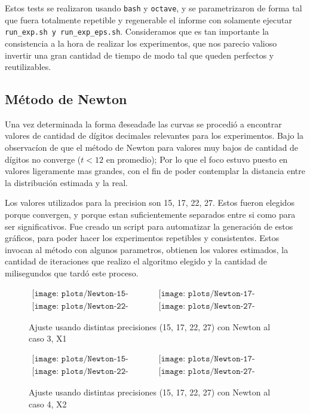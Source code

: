 Estos tests se realizaron usando \texttt{bash} y \texttt{octave}, y se parametrizaron
de forma tal que fuera totalmente repetible y regenerable el informe con solamente
ejecutar \texttt{run\_exp.sh y run\_exp\_eps.sh}. Consideramos que es tan importante
la consistencia a la hora de realizar los experimentos, que nos parecio valioso
invertir una gran cantidad de tiempo de modo tal que queden perfectos y reutilizables.

\subsection{M\'etodo de Newton}

Una vez determinada la forma \"deseada\" de las curvas se procedi\'o a encontrar
valores de cantidad de d\'igitos decimales relevantes para los experimentos. 
Bajo la observac\'ion de que el m\'etodo de Newton para valores muy bajos de 
cantidad de d\'igitos no converge ($t < 12$ en promedio); Por lo que el foco
estuvo puesto en valores ligeramente mas grandes, con el fin de poder contemplar
la distancia entre la distribuci\'on estimada y la real.

Los valores utilizados para la precision son 15, 17, 22, 27. 
Estos fueron elegidos porque convergen, y porque estan suficientemente separados
entre si como para ser significativos. Fue creado un script para automatizar la 
generaci\'on de estos gr\'aficos, para poder hacer los experimentos repetibles 
y consistentes. Estos invocan al m\'etodo con algunos parametros, 
obtienen los valores estimados, la cantidad de iteraciones que realizo el 
algoritmo elegido y la cantidad de milisegundos que tard\'o este proceso.

\begin{figure} [H]
$\begin{array}{cc}
\texttt{[image: plots/Newton-15-caso3.png]} &
\texttt{[image: plots/Newton-17-caso3.png]} \\
\texttt{[image: plots/Newton-22-caso3.png]} &
\texttt{[image: plots/Newton-27-caso3.png]}
\end{array}$
\caption{Ajuste usando distintas precisiones (15, 17, 22, 27) con Newton al caso 3, X1}
\label{fig:FitCaso3Newton}
\end{figure}

\begin{figure} [H]
$\begin{array}{cc}
\texttt{[image: plots/Newton-15-caso4.png]} &
\texttt{[image: plots/Newton-17-caso4.png]} \\
\texttt{[image: plots/Newton-22-caso4.png]} &
\texttt{[image: plots/Newton-27-caso4.png]}
\end{array}$
\caption{Ajuste usando distintas precisiones (15, 17, 22, 27) con Newton al caso 4, X2}
\label{fig:FitCaso4Newton}
\end{figure}


